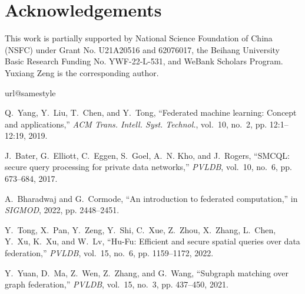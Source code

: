 \documentclass[11pt]{article}
\begin{document}
\section*{Acknowledgements}
This work is partially supported by National Science Foundation of China (NSFC) under Grant No. U21A20516 and 62076017, the Beihang University Basic Research Funding No. YWF-22-L-531, and WeBank Scholars Program. Yuxiang Zeng is the corresponding author.

%
%

\begin{thebibliography}{10}
\providecommand{\url}[1]{#1}
\csname url@samestyle\endcsname
\providecommand{\newblock}{\relax}
\providecommand{\bibinfo}[2]{#2}
\providecommand{\BIBentrySTDinterwordspacing}{\spaceskip=0pt\relax}
\providecommand{\BIBentryALTinterwordstretchfactor}{4}
\providecommand{\BIBentryALTinterwordspacing}{\spaceskip=\fontdimen2\font plus
\BIBentryALTinterwordstretchfactor\fontdimen3\font minus
  \fontdimen4\font\relax}
\providecommand{\BIBforeignlanguage}[2]{{%
\expandafter\ifx\csname l@#1\endcsname\relax
\typeout{** WARNING: IEEEtran.bst: No hyphenation pattern has been}%
\typeout{** loaded for the language `#1'. Using the pattern for}%
\typeout{** the default language instead.}%
\else
\language=\csname l@#1\endcsname
\fi
#2}}
\providecommand{\BIBdecl}{\relax}
\BIBdecl

Q.~Yang, Y.~Liu, T.~Chen, and Y.~Tong, ``Federated machine learning: Concept
  and applications,'' \emph{{ACM} Trans. Intell. Syst. Technol.}, vol.~10,
  no.~2, pp. 12:1--12:19, 2019.

J.~Bater, G.~Elliott, C.~Eggen, S.~Goel, A.~N. Kho, and J.~Rogers, ``{SMCQL:}
  secure query processing for private data networks,'' \emph{{PVLDB}}, vol.~10,
  no.~6, pp. 673--684, 2017.

A.~Bharadwaj and G.~Cormode, ``An introduction to federated computation,'' in
  \emph{{SIGMOD}}, 2022, pp. 2448--2451.

Y.~Tong, X.~Pan, Y.~Zeng, Y.~Shi, C.~Xue, Z.~Zhou, X.~Zhang, L.~Chen, Y.~Xu,
  K.~Xu, and W.~Lv, ``{Hu-Fu}: Efficient and secure spatial queries over data
  federation,'' \emph{{PVLDB}}, vol.~15, no.~6, pp. 1159--1172, 2022.

Y.~Yuan, D.~Ma, Z.~Wen, Z.~Zhang, and G.~Wang, ``Subgraph matching over graph
  federation,'' \emph{{PVLDB}}, vol.~15, no.~3, pp. 437--450, 2021.


\end{thebibliography}
\end{document}
